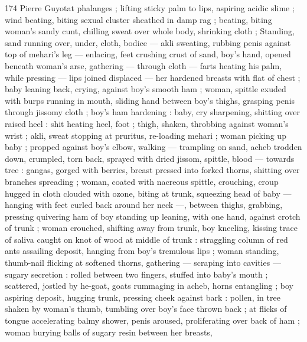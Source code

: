 174 Pierre Guyotat
phalanges ; lifting sticky palm to lips, aspiring acidic slime ; wind
beating, biting sexual cluster sheathed in damp rag ; beating, biting
woman's sandy cunt, chilling sweat over whole body, shrinking cloth
; Standing, sand running over, under, cloth, bodice — akli sweating,
rubbing penis against top of mehari’s leg — enlacing, feet crushing
crust of sand, boy's hand, opened beneath woman's arse, gathering
— through cloth — farts heating his palm, while pressing — lips
joined displaced — her hardened breasts with flat of chest ; baby
leaning back, crying, against boy's smooth ham ; woman, spittle
exuded with burps running in mouth, sliding hand between boy's
thighs, grasping penis through jissomy cloth ; boy's ham hardening
: baby, cry sharpening, shitting over raised heel : shit heating heel,
foot ; thigh, shaken, throbbing against woman's wrist ; akli, sweat
stopping at pruritus, re-loading mehari ; woman picking up baby ;
propped against boy's elbow, walking — trampling on sand, acheb
trodden down, crumpled, torn back, sprayed with dried jissom,
spittle, blood — towards tree : gangas, gorged with berries, breast
pressed into forked thorns, shitting over branches spreading ;
woman, coated with nacreous spittle, crouching, croup hugged in
cloth clouded with ozone, biting at trunk, squeezing head of baby —
hanging with feet curled back around her neck —, between thighs,
grabbing, pressing quivering ham of boy standing up leaning, with
one hand, against crotch of trunk ; woman crouched, shifting away
from trunk, boy kneeling, kissing trace of saliva caught on knot of
wood at middle of trunk : straggling column of red ants assailing
deposit, hanging from boy's tremulous lips ; woman standing,
thumb-nail flicking at softened thorns, gathering — scraping into
cavities — sugary secretion : rolled between two fingers, stuffed into
baby’s mouth ; scattered, jostled by he-goat, goats rummaging in
acheb, horns entangling ; boy aspiring deposit, hugging trunk,
pressing cheek against bark : pollen, in tree shaken by woman's
thumb, tumbling over boy's face thrown back ; at flicks of tongue
accelerating balmy shower, penis aroused, proliferating over back of
ham ; woman burying balls of sugary resin between her breasts,

